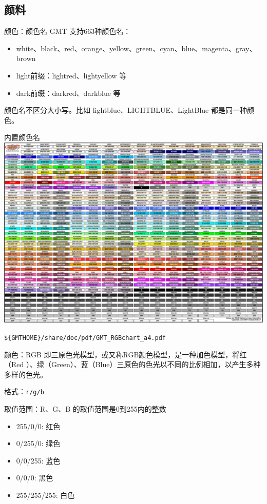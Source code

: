 \documentclass[UTF8, 11pt]{ctexbeamer}
\begin{document}
\subsection{颜料}
\begin{frame}[fragile]{颜色：颜色名}
GMT 支持663种颜色名：
\begin{itemize}
\item white、black、red、orange、yellow、green、cyan、blue、magenta、gray、brown
\item light前缀：lightred、lightyellow 等
\item dark前缀：darkred、darkblue 等
\end{itemize}
颜色名不区分大小写。比如 lightblue、LIGHTBLUE、LightBlue 都是同一种颜色。
\end{frame}
\begin{frame}[fragile]{内置颜色名}
\includegraphics[width=\textwidth]{GMT_RGBchart}

\verb|${GMTHOME}/share/doc/pdf/GMT_RGBchart_a4.pdf|
\end{frame}

\begin{frame}[fragile]{颜色：RGB}
即三原色光模型，或又称RGB颜色模型，是一种加色模型，将红（Red ）、绿（Green）、蓝（Blue）三原色的色光以不同的比例相加，以产生多种多样的色光。

格式：\verb|r/g/b|

取值范围：R、G、B 的取值范围是0到255内的整数

\begin{itemize}
\item 255/0/0: 红色
\item 0/255/0: 绿色
\item 0/0/255: 蓝色
\item 0/0/0: 黑色
\item 255/255/255: 白色
\end{itemize}
\end{frame}
\end{document}
